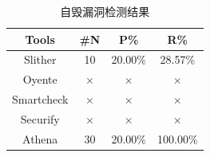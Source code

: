 \begin{table}[htbp]
\begin{minipage}[t]{0.48\textwidth}
  \label{tab:eval_llc}%
  \end{minipage}
  \begin{minipage}[t]{0.48\textwidth}
    \caption{自毁漏洞检测结果}
    \begin{tabular}{cccc}
    \toprule
    Tools & \#N & P\% & R\% \\
    \midrule
    Slither & 10    & 20.00\%    & 28.57\% \\
    Oyente  & $\times$ & $\times$ & $\times$ \\
    Smartcheck  & $\times$ & $\times$ & $\times$ \\
    Securify & $\times$  & $\times$ & $\times$ \\
    Athena & 30    & 20.00\%     & 100.00\% \\
    \bottomrule
    \end{tabular}%
  \label{tab:eval_selfdestruct}%
  \end{minipage}
\end{table}%


